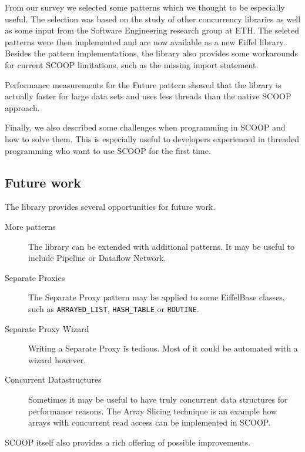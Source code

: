 \documentclass[a4paper,10pt,titlepage]{article}
\begin{document}
From our survey we selected some patterns which we thought to be especially useful.
The selection was based on the study of other concurrency libraries as well as some input from the Software Engineering research group at ETH.
The seleted patterns were then implemented and are now available as a new Eiffel library.
Besides the pattern implementations, the library also provides some workarounds for current SCOOP limitations, such as the missing import statement.

Performance measurements for the Future pattern showed that the library is actually faster for large data sets and uses less threads than the native SCOOP approach.

Finally, we also described some challenges when programming in SCOOP and how to solve them.
This is especially useful to developers experienced in threaded programming who want to use SCOOP for the first time.

\subsection{Future work}

The library provides several opportunities for future work.

\begin{description}
 \item [More patterns] The library can be extended with additional patterns.
 It may be useful to include Pipeline or Dataflow Network.
 \item [Separate Proxies] The Separate Proxy pattern may be applied to some EiffelBase classes, such as \lstinline!ARRAYED_LIST!, \lstinline!HASH_TABLE! or \lstinline!ROUTINE!.
 \item [Separate Proxy Wizard] Writing a Separate Proxy is tedious. Most of it could be automated with a wizard however.
 \item [Concurrent Datastructures] Sometimes it may be useful to have truly concurrent data structures for performance reasons.
The Array Slicing technique \cite{paper:array-slicing} is an example how arrays with concurrent read access can be implemented in SCOOP.
\end{description}

SCOOP itself also provides a rich offering of possible improvements.
\end{document}
